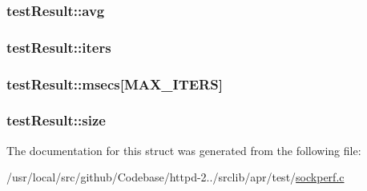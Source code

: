 \subsubsection[{\texorpdfstring{avg}{avg}}]{ test\+Result\+::avg}\hypertarget{structtestResult_a314c3958522e08f8966a7a7f44267f58}{}\label{structtestResult_a314c3958522e08f8966a7a7f44267f58}
\subsubsection[{\texorpdfstring{iters}{iters}}]{ test\+Result\+::iters}\hypertarget{structtestResult_a4c897ff41ed805006f004a102feadada}{}\label{structtestResult_a4c897ff41ed805006f004a102feadada}
\subsubsection[{\texorpdfstring{msecs}{msecs}}]{ test\+Result\+::msecs\mbox{[}{\bf M\+A\+X\+\_\+\+I\+T\+E\+RS}\mbox{]}}\hypertarget{structtestResult_add970ab6e22eca4b2c2d252a0292d62d}{}\label{structtestResult_add970ab6e22eca4b2c2d252a0292d62d}
\subsubsection[{\texorpdfstring{size}{size}}]{ test\+Result\+::size}\hypertarget{structtestResult_ab27c1fa625ffceb52ab42419d4530184}{}\label{structtestResult_ab27c1fa625ffceb52ab42419d4530184}


The documentation for this struct was generated from the following file\+:\begin{DoxyCompactItemize}
\item 
/usr/local/src/github/\+Codebase/httpd-\/2../srclib/apr/test/\hyperlink{sockperf_8c}{sockperf.\+c}\end{DoxyCompactItemize}
